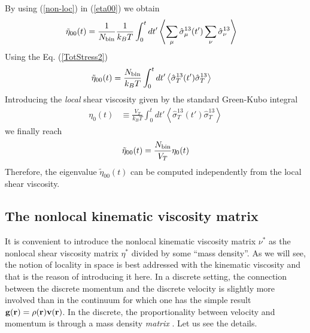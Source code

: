 \documentclass[b5paper,openright,11pt]{book}
\newcommand{\llangle}{\left\langle}
\newcommand{\rrangle}{\right\rangle}
\begin{document}
By using (\ref{non-loc}) in (\ref{eta00}) we obtain
\begin{align}
    \tilde{\eta}_{00}(t)&=\frac{1}{N_{\rm bin}}\frac{1}{k_BT}\int_0^tdt'\llangle \sum_{\mu}\hat{\sigma}^{13}_{\mu}(t')\sum_{\nu}\hat{\sigma}^{13}_{\nu}\rrangle
\end{align}
Using the Eq. (\ref{TotStress2})
\begin{align}
    \tilde{\eta}_{00}(t)&=\frac{N_{\rm bin}}{k_BT}\int_0^tdt'\llangle \hat{\sigma}^{13}_T(t')\hat{\sigma}^{13}_T\rrangle
\end{align}
Introducing the \textit{local}  shear viscosity given by the standard Green-Kubo
integral
\begin{align}
  \eta_0(t) &\equiv \frac{V_T}{k_BT}\int_0^t dt'\llangle \hat{\sigma}_T^{13}(t')\hat{\sigma}_T^{13}
\rrangle
\label{etat}
\end{align}
we finally reach 
\begin{align}
    \tilde{\eta}_{00}(t)=\frac{N_{\rm bin}}{V_T}\eta_0(t)
\end{align}
Therefore, the eigenvalue $\tilde{\eta}_{00}(t)$ can be computed independently from
the local shear viscosity.

\subsection{The nonlocal kinematic viscosity matrix}
It is convenient to introduce the nonlocal kinematic viscosity matrix
$\nu^*$ as  the nonlocal shear  viscosity matrix $\eta^*$  divided by
some ``mass density''. As we will see, the notion of locality in space
is best addressed with the kinematic  viscosity and that is the reason
of introducing it here. In  a discrete setting, the connection between
the  discrete momentum  and  the discrete  velocity  is slightly  more
involved than  in the continuum  for which  one has the  simple result
${\bf g}({\bf  r})=\rho({\bf r}){\bf  v}({\bf r})$.  In  the discrete,
the proportionality  between velocity and  momentum is through  a mass
density \textit{matrix} \cite{3}.  Let us see the details.
\end{document}
